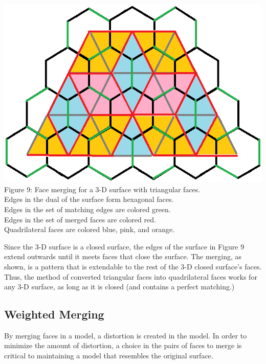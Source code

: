 \documentclass[12pt]{article}
\begin{document}
\begin{flushleft}
\begin{center}
\includegraphics[scale=0.8]{images/3dmerging.png}\\
Figure 9: Face merging for a 3-D surface with triangular faces.\\
Edges in the dual of the surface form hexagonal faces.\\
Edges in the set of matching edges are colored green.\\
Edges in the set of merged faces are colored red.\\
Quadrilateral faces are colored blue, pink, and orange.
\end{center}

Since the 3-D surface is a closed surface, the edges of the surface in Figure 9 extend outwards until it meets faces that close the surface. The merging, as shown, is a pattern that is extendable to the rest of the 3-D closed surface's faces. Thus, the method of converted triangular faces into quadrilateral faces works for any 3-D surface, as long as it is closed (and contains a perfect matching.)

\subsection*{Weighted Merging}
By merging faces in a model, a distortion is created in the model. In order to minimize the amount of distortion, a choice in the pairs of faces to merge is critical to maintaining a model that resembles the original surface.


\end{flushleft}
\end{document}
